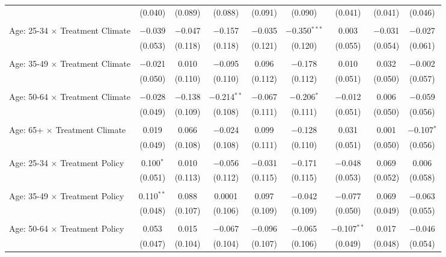 \begin{tabular}{@{\extracolsep{5pt}}lcccccccc}
  & (0.040) & (0.089) & (0.088) & (0.091) & (0.090) & (0.041) & (0.041) & (0.046) \\ 
  & & & & & & & & \\ 
 Age: 25-34 $\times$ Treatment Climate & $-$0.039 & $-$0.047 & $-$0.157 & $-$0.035 & $-$0.350$^{***}$ & 0.003 & $-$0.031 & $-$0.027 \\ 
  & (0.053) & (0.118) & (0.118) & (0.121) & (0.120) & (0.055) & (0.054) & (0.061) \\ 
  & & & & & & & & \\ 
 Age: 35-49 $\times$ Treatment Climate & $-$0.021 & 0.010 & $-$0.095 & 0.096 & $-$0.178 & 0.010 & 0.032 & $-$0.002 \\ 
  & (0.050) & (0.110) & (0.110) & (0.112) & (0.112) & (0.051) & (0.050) & (0.057) \\ 
  & & & & & & & & \\ 
 Age: 50-64 $\times$ Treatment Climate & $-$0.028 & $-$0.138 & $-$0.214$^{**}$ & $-$0.067 & $-$0.206$^{*}$ & $-$0.012 & 0.006 & $-$0.059 \\ 
  & (0.049) & (0.109) & (0.108) & (0.111) & (0.111) & (0.051) & (0.050) & (0.056) \\ 
  & & & & & & & & \\ 
 Age: 65+ $\times$ Treatment Climate & 0.019 & 0.066 & $-$0.024 & 0.099 & $-$0.128 & 0.031 & 0.001 & $-$0.107$^{*}$ \\ 
  & (0.049) & (0.108) & (0.108) & (0.111) & (0.110) & (0.051) & (0.050) & (0.056) \\ 
  & & & & & & & & \\ 
 Age: 25-34 $\times$ Treatment Policy & 0.100$^{*}$ & 0.010 & $-$0.056 & $-$0.031 & $-$0.171 & $-$0.048 & 0.069 & 0.006 \\ 
  & (0.051) & (0.113) & (0.112) & (0.115) & (0.115) & (0.053) & (0.052) & (0.058) \\ 
  & & & & & & & & \\ 
 Age: 35-49 $\times$ Treatment Policy & 0.110$^{**}$ & 0.088 & 0.0001 & 0.097 & $-$0.042 & $-$0.077 & 0.069 & $-$0.063 \\ 
  & (0.048) & (0.107) & (0.106) & (0.109) & (0.109) & (0.050) & (0.049) & (0.055) \\ 
  & & & & & & & & \\ 
 Age: 50-64 $\times$ Treatment Policy & 0.053 & 0.015 & $-$0.067 & $-$0.096 & $-$0.065 & $-$0.107$^{**}$ & 0.017 & $-$0.046 \\ 
  & (0.047) & (0.104) & (0.104) & (0.107) & (0.106) & (0.049) & (0.048) & (0.054) \\ 

\end{tabular}
